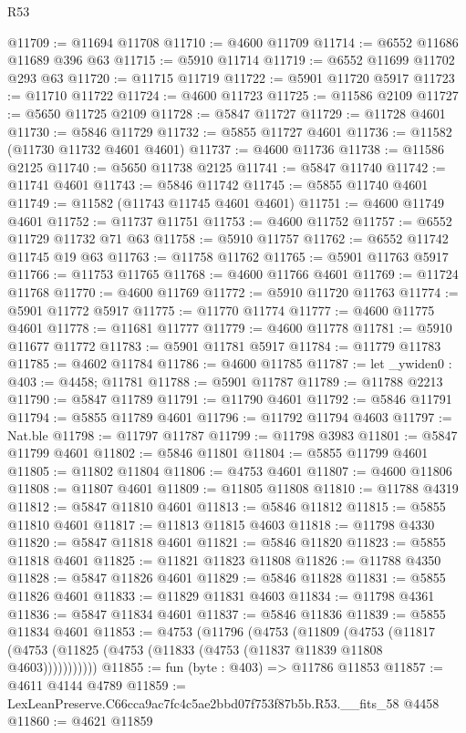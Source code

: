 \begin{lexlean}{R53}
\begin{coremodule}
@11709 := @11694 @11708
@11710 := @4600 @11709
@11714 := @6552 @11686 @11689 @396 @63
@11715 := @5910 @11714
@11719 := @6552 @11699 @11702 @293 @63
@11720 := @11715 @11719
@11722 := @5901 @11720 @5917
@11723 := @11710 @11722
@11724 := @4600 @11723
@11725 := @11586 @2109
@11727 := @5650 @11725 @2109
@11728 := @5847 @11727
@11729 := @11728 @4601
@11730 := @5846 @11729
@11732 := @5855 @11727 @4601
@11736 := @11582 (@11730 @11732 @4601 @4601)
@11737 := @4600 @11736
@11738 := @11586 @2125
@11740 := @5650 @11738 @2125
@11741 := @5847 @11740
@11742 := @11741 @4601
@11743 := @5846 @11742
@11745 := @5855 @11740 @4601
@11749 := @11582 (@11743 @11745 @4601 @4601)
@11751 := @4600 @11749 @4601
@11752 := @11737 @11751
@11753 := @4600 @11752
@11757 := @6552 @11729 @11732 @71 @63
@11758 := @5910 @11757
@11762 := @6552 @11742 @11745 @19 @63
@11763 := @11758 @11762
@11765 := @5901 @11763 @5917
@11766 := @11753 @11765
@11768 := @4600 @11766 @4601
@11769 := @11724 @11768
@11770 := @4600 @11769
@11772 := @5910 @11720 @11763
@11774 := @5901 @11772 @5917
@11775 := @11770 @11774
@11777 := @4600 @11775 @4601
@11778 := @11681 @11777
@11779 := @4600 @11778
@11781 := @5910 @11677 @11772
@11783 := @5901 @11781 @5917
@11784 := @11779 @11783
@11785 := @4602 @11784
@11786 := @4600 @11785
@11787 := let _ywiden0 : @403 := @4458; @11781
@11788 := @5901 @11787
@11789 := @11788 @2213
@11790 := @5847 @11789
@11791 := @11790 @4601
@11792 := @5846 @11791
@11794 := @5855 @11789 @4601
@11796 := @11792 @11794 @4603
@11797 := Nat.ble
@11798 := @11797 @11787
@11799 := @11798 @3983
@11801 := @5847 @11799 @4601
@11802 := @5846 @11801
@11804 := @5855 @11799 @4601
@11805 := @11802 @11804
@11806 := @4753 @4601
@11807 := @4600 @11806
@11808 := @11807 @4601
@11809 := @11805 @11808
@11810 := @11788 @4319
@11812 := @5847 @11810 @4601
@11813 := @5846 @11812
@11815 := @5855 @11810 @4601
@11817 := @11813 @11815 @4603
@11818 := @11798 @4330
@11820 := @5847 @11818 @4601
@11821 := @5846 @11820
@11823 := @5855 @11818 @4601
@11825 := @11821 @11823 @11808
@11826 := @11788 @4350
@11828 := @5847 @11826 @4601
@11829 := @5846 @11828
@11831 := @5855 @11826 @4601
@11833 := @11829 @11831 @4603
@11834 := @11798 @4361
@11836 := @5847 @11834 @4601
@11837 := @5846 @11836
@11839 := @5855 @11834 @4601
@11853 := @4753
    (@11796
      (@4753
        (@11809
          (@4753 (@11817 (@4753 (@11825 (@4753 (@11833 (@4753 (@11837 @11839 @11808 @4603)))))))))))
@11855 := fun (byte : @403) => @11786 @11853
@11857 := @4611 @4144 @4789
@11859 := LexLeanPreserve.C66cca9ac7fc4c5ae2bbd07f753f87b5b.R53.__fits_58 @4458
@11860 := @4621 @11859

\end{coremodule}
\end{lexlean}
